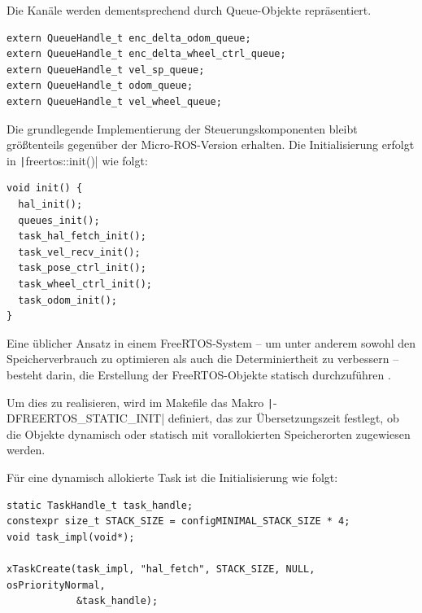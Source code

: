 Die Kanäle werden dementsprechend durch Queue-Objekte repräsentiert.

\begin{code}
\begin{verbatim}
extern QueueHandle_t enc_delta_odom_queue;
extern QueueHandle_t enc_delta_wheel_ctrl_queue;
extern QueueHandle_t vel_sp_queue;
extern QueueHandle_t odom_queue;
extern QueueHandle_t vel_wheel_queue;
\end{verbatim}
\end{code}

Die grundlegende Implementierung der Steuerungskomponenten bleibt größtenteils
gegenüber der Micro-ROS-Version erhalten. Die Initialisierung erfolgt in
\texttt|freertos::init()| wie folgt:

\begin{code}
\begin{verbatim}
void init() {
  hal_init();
  queues_init();
  task_hal_fetch_init();
  task_vel_recv_init();
  task_pose_ctrl_init();
  task_wheel_ctrl_init();
  task_odom_init();
}
\end{verbatim}
\end{code}

Eine üblicher Ansatz in einem FreeRTOS-System -- um unter anderem sowohl den
Speicherverbrauch zu optimieren als auch die Determiniertheit zu verbessern --
besteht darin, die Erstellung der FreeRTOS-Objekte statisch durchzuführen
\cite{freertos_memory_management}.

Um dies zu realisieren, wird im Makefile das Makro
\texttt|-DFREERTOS_STATIC_INIT| definiert, das zur Übersetzungszeit
festlegt, ob die Objekte dynamisch oder statisch mit vorallokierten
Speicherorten zugewiesen werden.

Für eine dynamisch allokierte Task ist die Initialisierung wie folgt:

\begin{code}
\begin{verbatim}
static TaskHandle_t task_handle;
constexpr size_t STACK_SIZE = configMINIMAL_STACK_SIZE * 4;
void task_impl(void*);

xTaskCreate(task_impl, "hal_fetch", STACK_SIZE, NULL, osPriorityNormal,
            &task_handle);
\end{verbatim}
\end{code}

